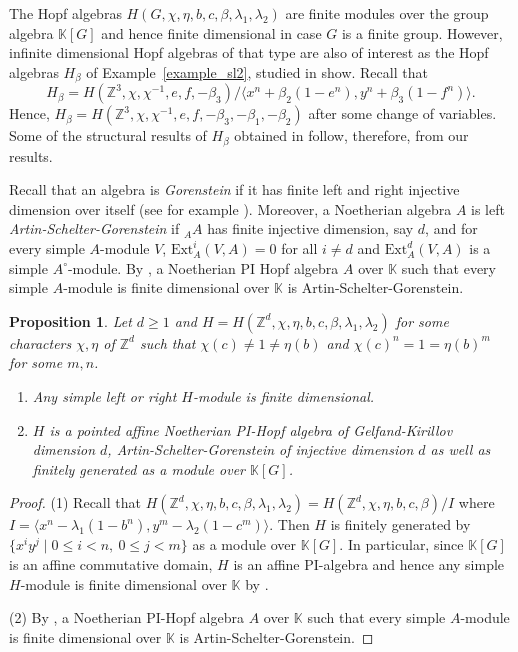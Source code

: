 \documentclass[11pt, twoside]{amsart}
\newtheorem{proposition}[theorem]{Proposition}
\theoremstyle{definition}
\newcommand{\ZZ}{\mathbb{Z}}
\newcommand{\KK}{\mathbb{K}}
\begin{document}
The Hopf algebras $H(G, \chi, \eta, b, c, \beta, \lambda_1, \lambda_2)$ are finite modules over the group algebra $\KK[G]$ and hence finite dimensional in case $G$ is a finite group. However, infinite dimensional Hopf algebras of that type are also of interest as the Hopf algebras $H_\beta$ of Example~\ref{example_sl2}, studied in \cite{Wang-Wu-Tan} show. Recall that 
%
\[H_\beta = H(\ZZ^3, \chi, \chi^{-1}, e, f, -\beta_3)/\langle x^n + \beta_2 (1 - e^n), y^n + \beta_3 (1 - f^n)\rangle.\]
%
Hence, $H_\beta = H(\ZZ^3, \chi, \chi^{-1}, e, f, -\beta_3, -\beta_1, -\beta_2)$ after some change of variables. Some of the structural results of $H_\beta$ obtained in \cite{Wang-Wu-Tan} follow, therefore, from our results. 

Recall that an algebra is \emph{Gorenstein} if it has finite left and right injective dimension over itself (see for example \cite{Wu-Zhang}). Moreover, a Noetherian algebra $A$ is left \emph{Artin-Schelter-Gorenstein} if $_{A}A$ has finite injective dimension, say $d$, and for every simple $A$-module $V$, $\mathrm{Ext}_{A}^{i}(V, A) = 0$ for all $i \neq d$ and $\mathrm{Ext}_{A}^{d}(V, A)$ is a simple $A^{\circ}$-module. By \cite[Theorem 3.5]{Wu-Zhang}, a Noetherian PI Hopf algebra $A$ over $\KK$ such that every simple $A$-module is finite dimensional over $\KK$ is Artin-Schelter-Gorenstein.

\begin{proposition}
    Let $d \geq 1$ and $H = H(\ZZ^d, \chi, \eta, b, c, \beta, \lambda_1, \lambda_2)$ for some characters $\chi, \eta$ of $\ZZ^d$ such that $\chi(c) \neq 1 \neq \eta(b)$ and $\chi(c)^n = 1 = \eta(b)^m$ for some $m, n$. 
    \begin{enumerate}
        \item Any simple left or right $H$-module is finite dimensional.
        \item $H$ is a pointed affine Noetherian PI-Hopf algebra of Gelfand-Kirillov dimension $d$, Artin-Schelter-Gorenstein of injective dimension $d$ as well as finitely generated as a module over $\KK[G]$. 
    \end{enumerate}
\end{proposition}
%
\begin{proof}
    (1) Recall that $H(\ZZ^d, \chi, \eta, b, c, \beta, \lambda_1, \lambda_2) = H(\ZZ^d, \chi,\eta, b, c, \beta)/I$ where $I = \langle x^n - \lambda_1 (1 - b^n), y^m - \lambda_2 (1 - c^m)\rangle$. Then $H$ is finitely generated by $\{x^i y^j \mid 0 \leq i < n,\ 0 \leq j < m\}$ as a module over $\KK[G]$. In particular, since $\KK[G]$ is an affine commutative domain, $H$ is an affine PI-algebra and hence any simple $H$-module is finite dimensional over $\KK$ by \cite[13.10.3]{McConnell-Robson}.

    (2) By \cite[Theorem 3.5]{Wu-Zhang}, a Noetherian PI-Hopf algebra $A$ over $\KK$ such that every simple $A$-module is finite dimensional over $\KK$ is Artin-Schelter-Gorenstein. 
\end{proof}
%
\end{document}
